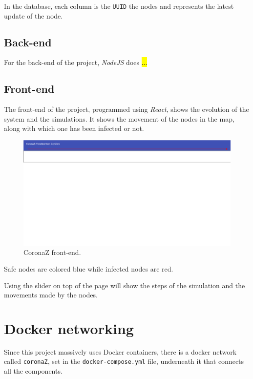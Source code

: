 \documentclass[conference]{IEEEtran}
\begin{document}
		In the database, each column is the \texttt{UUID} the nodes and represents the latest update of the node.
	
	\subsection{Back-end}
	
		For the back-end of the project, \textit{NodeJS} does \hl{...}
	
	\subsection{Front-end}

		The front-end of the project, programmed using \textit{React}, shows the evolution of the system and the simulations.
		It shows the movement of the nodes in the map, along with which one has been infected or not.
		
		\begin{figure}[htbp]
			\centerline{\includegraphics[width=\linewidth]{img/frontend.png}}
			\caption{CoronaZ front-end.}
			\label{fig:front-end}
		\end{figure}
	
		Safe nodes are colored blue while infected nodes are red.
		
		Using the slider on top of the page will show the steps of the simulation and the movements made by the nodes.
	
\section{Docker networking}\label{sec:network}

	Since this project massively uses Docker containers, there is a docker network called \texttt{coronaZ}, set in the \texttt{docker-compose.yml} file, underneath it that connects all the components.
	
\end{document}
